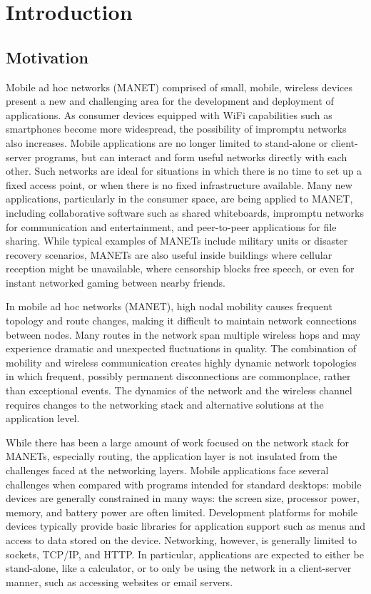 \chapter{Introduction}

\section{Motivation}

Mobile ad hoc networks (MANET) comprised of small, mobile, wireless devices present a new and challenging area for the development and deployment of applications. As consumer devices equipped with WiFi capabilities such as smartphones become more widespread, the possibility of impromptu networks also increases. Mobile applications are no longer limited to stand-alone or client-server programs, but can interact and form useful networks directly with each other. Such networks are ideal for situations in which there is no time to set up a fixed access point, or when there is no fixed infrastructure available. Many new applications, particularly in the consumer space, are being applied to MANET, including collaborative software such as shared whiteboards, impromptu networks for communication and entertainment, and peer-to-peer applications for file sharing. While typical examples of MANETs include military units or disaster recovery scenarios, MANETs are also useful inside buildings where cellular reception might be unavailable, where censorship blocks free speech, or even for instant networked gaming between nearby friends.

In mobile ad hoc networks (MANET), high nodal mobility causes frequent topology and route changes, making it difficult to maintain network connections between nodes. Many routes in the network span multiple wireless hops and may experience dramatic and unexpected fluctuations in quality. The combination of mobility and wireless communication creates highly dynamic network topologies in which frequent, possibly permanent disconnections are commonplace, rather than exceptional events. The dynamics of the network and the wireless channel requires changes to the networking stack and alternative solutions at the application level.

While there has been a large amount of work focused on the network stack for MANETs, especially routing, the application layer is not insulated from the challenges faced at the networking layers. Mobile applications face several challenges when compared with programs intended for standard desktops: mobile devices are generally constrained in many ways: the screen size, processor power, memory, and battery power are often limited. Development platforms for mobile devices typically provide basic libraries for application support such as menus and access to data stored on the device. Networking, however, is generally limited to sockets, TCP/IP, and HTTP. In particular, applications are expected to either be stand-alone, like a calculator, or to only be using the network in a client-server manner, such as accessing websites or email servers.

